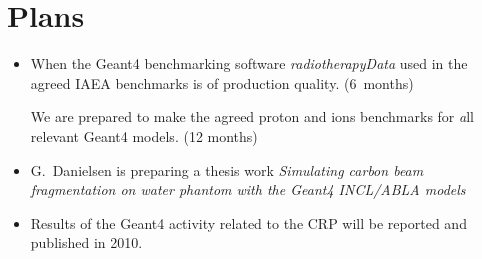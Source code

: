 \documentclass[twoside,floatfix,a4wide]{d}
\numberwithin{equation}{section} %
\begin{document}

\section{Plans}
\vspace{-0.4cm}
\begin{itemize}
\item  When the Geant4 benchmarking software {\em radiotherapyData} used in 
the agreed IAEA benchmarks is of production quality. (6~months)
\begin{itemize}
We are prepared to make the agreed proton and ions 
benchmarks for {\emph all} relevant Geant4 models. (12 months)

\end{itemize}
\item G.~Danielsen is preparing a thesis work 
{\em Simulating carbon beam fragmentation on water phantom with the Geant4 INCL/ABLA models}
\item Results of the Geant4 activity related to the CRP will be reported and published in 2010.
\end{itemize}


%  
\end{document}
